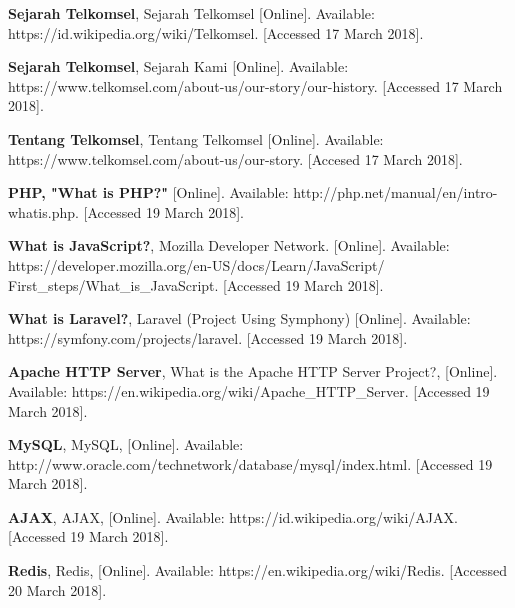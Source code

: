 \begin{thebibliography}{15}
	
	\textbf{Sejarah Telkomsel}, Sejarah Telkomsel [Online]. Available: https://id.wikipedia.org/wiki/Telkomsel. [Accessed 17 March 2018].
	
	\textbf {Sejarah Telkomsel}, Sejarah Kami [Online]. Available: https://www.telkomsel.com/about-us/our-story/our-history. [Accessed 17 March 2018].
	
	\textbf{Tentang Telkomsel}, Tentang Telkomsel [Online]. Available: https://www.telkomsel.com/about-us/our-story. [Accesed 17 March 2018].
	
	\textbf{PHP, "What is PHP?"} [Online]. Available: http://php.net/manual/en/intro-whatis.php. [Accessed 19 March 2018].		
	
	\textbf{What is JavaScript?}, Mozilla Developer Network. [Online]. Available: https://developer.mozilla.org/en-US/docs/Learn/JavaScript/
	First\_steps/What\_is\_JavaScript. [Accessed 19 March 2018].
	
	\textbf{What is Laravel?}, Laravel (Project Using Symphony) [Online]. Available: https://symfony.com/projects/laravel. [Accessed 19 March 2018].
	
	\textbf {Apache HTTP Server}, What is the Apache HTTP Server Project?, [Online]. Available: https://en.wikipedia.org/wiki/Apache\_HTTP\_Server. [Accessed 19 March 2018].
	
	\textbf{MySQL}, MySQL, [Online]. Available: http://www.oracle.com/technetwork/database/mysql/index.html. [Accessed 19 March 2018].
	
	\textbf{AJAX}, AJAX, [Online]. Available: https://id.wikipedia.org/wiki/AJAX. [Accessed 19 March 2018].
	
	\textbf{Redis}, Redis, [Online]. Available: https://en.wikipedia.org/wiki/Redis. [Accessed 20 March 2018].
\end{thebibliography}
